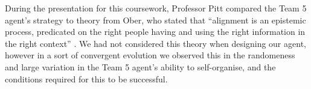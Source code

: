 During the presentation for this coursework, Professor Pitt compared the Team 5 agent's strategy to theory from Ober, who stated that ``alignment is an epistemic process, predicated on the right people having and using the right information in the right context'' \cite{ober_athens}. We had not considered this theory when designing our agent, however in a sort of convergent evolution we observed this in the randomeness and large variation in the Team 5 agent's ability to self-organise, and the conditions required for this to be successful.
